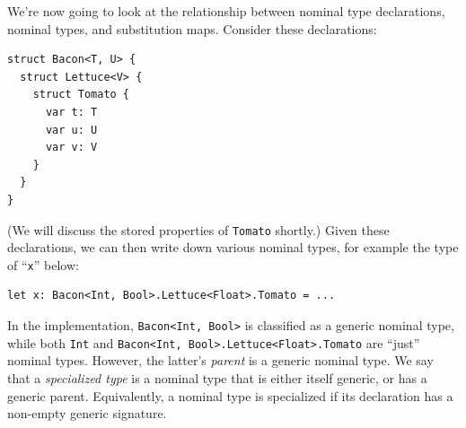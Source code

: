 \documentclass[../generics]{subfiles}
\begin{document}
We're now going to look at the relationship between nominal type declarations, nominal types, and substitution maps. Consider these declarations:
\begin{Verbatim}
struct Bacon<T, U> {
  struct Lettuce<V> {
    struct Tomato {
      var t: T
      var u: U
      var v: V
    }
  }
}
\end{Verbatim}
(We will discuss the stored properties of \texttt{Tomato} shortly.) Given these declarations, we can then write down various nominal types, for example the type of ``\texttt{x}'' below:
\begin{Verbatim}
let x: Bacon<Int, Bool>.Lettuce<Float>.Tomato = ...
\end{Verbatim}
In the implementation, \texttt{Bacon<Int, Bool>} is classified as a generic nominal type, while both \texttt{Int} and \texttt{Bacon<Int, Bool>.Lettuce<Float>.Tomato} are ``just'' nominal types. However, the latter's \emph{parent} is a generic nominal type. We say that a \emph{specialized type} is a nominal type that is either itself generic, or has a generic parent. Equivalently, a nominal type is specialized if its declaration has a non-empty generic signature.
\end{document}
